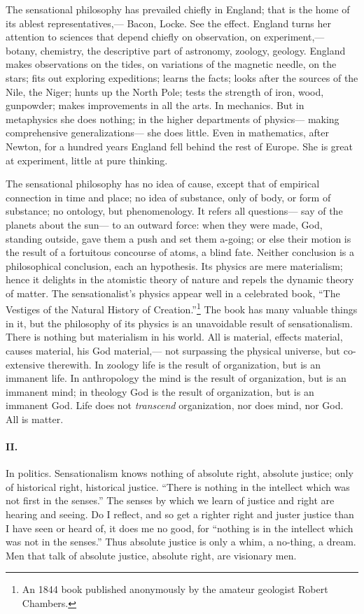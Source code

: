 \documentclass[12pt]{article}
\begin{document}
The sensational philosophy has prevailed chiefly in England; that is the home of its ablest representatives,--- Bacon, Locke. See the effect. England turns her attention to sciences that depend chiefly on observation, on exper\-iment,--- botany, chemistry, the descriptive part of astronomy, zoology, geology. England makes observations on the tides, on variations of the magnetic needle, on the stars; fits out exploring expeditions; learns the facts; looks after the sources of the Nile, the Niger; hunts up the North Pole; tests the strength of iron, wood, gunpowder; makes improvements in all the arts. In mechanics. But in metaphysics she does nothing; in the higher departments of physics--- making comprehensive generalizations--- she does little. Even in mathematics, after Newton, for a hundred years England fell behind the rest of Europe. She is great at experiment, little at pure thinking. 

The sensational philosophy has no idea of cause, except that of empirical connection in time and place; no idea of substance, only of body, or form of substance; no ontology, but phenomenology. It refers all questions--- say of the planets about the sun--- to an outward force: when they were made, God, standing outside, gave them a push and set them a-going; or else their motion is the result of a fortuitous concourse of atoms, a blind fate. Neither conclusion is a philosophical conclusion, each an hypothesis. Its physics are mere materialism; hence it delights in the atomistic theory of nature and repels the dynamic theory of matter. The sensationalist's physics appear well in a celebrated book, ``The Vestiges of the Natural History of Creation.''\footnote{An 1844 book published anonymously by the amateur geologist Robert Chambers.} The book has many valuable things in it, but the philosophy of its physics is an unavoidable result of sensationalism. There is nothing but materialism in his world. All is material, effects material, causes material, his God material,--- not surpassing the physical universe, but co-extensive therewith. In zoology life is the result of organization, but is an immanent life. In anthropology the mind is the result of organization, but is an immanent mind; in theology God is the result of organization, but is an immanent God. Life does not \emph{transcend} organization, nor does mind, nor God. All is matter. 

\paragraph{II.} In politics. Sensationalism knows nothing of absolute right, absolute justice; only of historical right, historical justice. ``There is nothing in the intellect which was not first in the senses.'' The senses by which we learn of justice and right are hearing and seeing. Do I reflect, and so get a righter right and juster justice than I have seen or heard of, it does me no good, for ``nothing is in the intellect which was not in the senses.'' Thus absolute justice is only a whim, a no-thing, a dream. Men that talk of absolute justice, absolute right, are visionary men.
\end{document}
